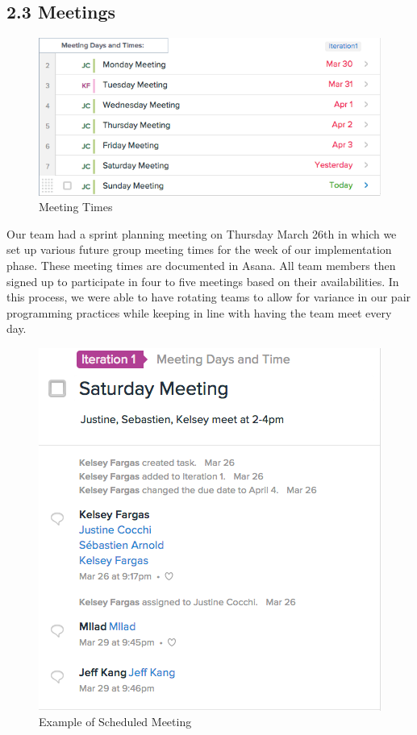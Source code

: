 \documentclass[]{article}
\begin{document}
\subsection{2.3 Meetings}\label{meetings}
\begin{figure}[htbp]
\centering
\includegraphics{meetings.png}
\caption{Meeting Times}
\end{figure}

Our team had a sprint planning meeting on Thursday March 26th in which
we set up various future group meeting times for the week of our
implementation phase. These meeting times are documented in Asana. All
team members then signed up to participate in four to five meetings
based on their availabilities. In this process, we were able to have
rotating teams to allow for variance in our pair programming practices
while keeping in line with having the team meet every day.

\begin{figure}[htbp]
\centering
\includegraphics{SatMeeting.png}
\caption{Example of Scheduled Meeting}
\end{figure}
\end{document}
